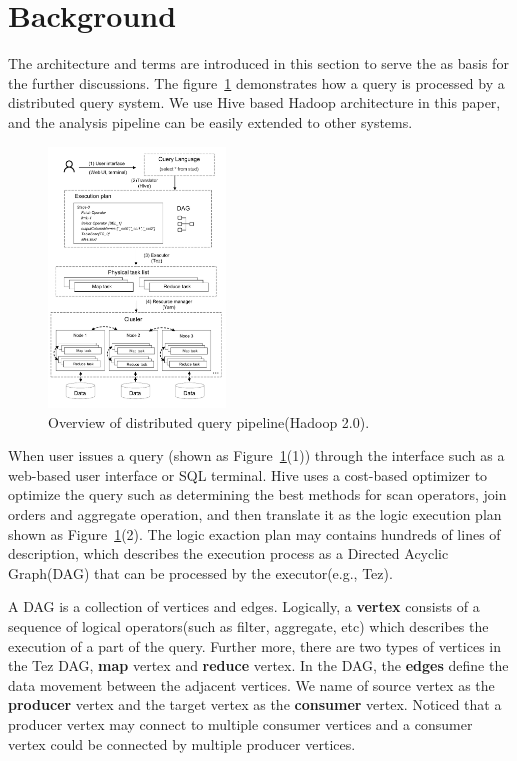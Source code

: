 \section{Background}\label{sec:background}

The architecture and terms are introduced in this section to serve the as basis for the further discussions. 
The figure~\ref{fig:architecture} demonstrates how a query is processed by a distributed query system. We use Hive based Hadoop architecture in this paper, and the analysis pipeline can be easily extended to other systems.

\begin{figure}[t]
	\centering
	\includegraphics[width=0.42\textwidth]{figures/background/background.pdf}
	\vspace{-3mm}
	\caption{Overview of distributed query pipeline(Hadoop 2.0).}
	\label{fig:architecture}
	\vspace{-3mm}
\end{figure}

When user issues a query (shown as Figure~\ref{fig:architecture}(1)) through the interface such as a web-based user interface or SQL terminal. 
Hive uses a cost-based optimizer to optimize the query such as determining the best methods for scan operators, join orders and aggregate operation, and then translate it as the logic execution plan shown as Figure~\ref{fig:architecture}(2). The logic exaction plan may contains hundreds of lines of description, which describes the execution process as a Directed Acyclic Graph(DAG) that can be processed by the executor(e.g., Tez). 

A DAG is a collection of vertices and edges. Logically, a \textbf{vertex} consists of a sequence of logical operators(such as filter, aggregate, etc) which describes the execution of a part of the query. Further more, there are two types of vertices in the Tez DAG, \textbf{map} vertex and \textbf{reduce} vertex.  
In the DAG,  the \textbf{edges} define the data movement between the adjacent vertices. We name of source vertex as the \textbf{producer} vertex and the target vertex as the \textbf{consumer} vertex. Noticed that a producer vertex may connect to multiple consumer vertices and a consumer vertex could be connected by multiple producer vertices.  

